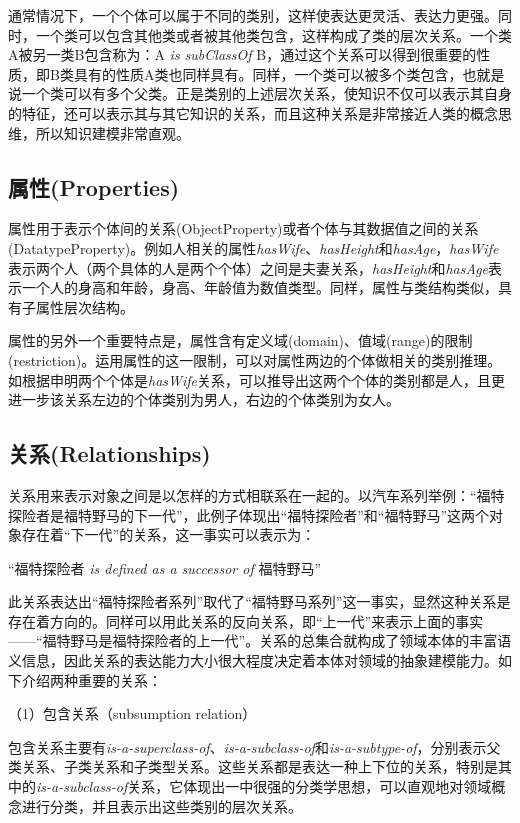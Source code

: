 通常情况下，一个个体可以属于不同的类别，这样使表达更灵活、表达力更强。同时，一个类可以包含其他类或者被其他类包含，这样构成了类的层次关系。一个类A被另一类B包含称为：A \textit{is subClassOf} B，通过这个关系可以得到很重要的性质，即B类具有的性质A类也同样具有。同样，一个类可以被多个类包含，也就是说一个类可以有多个父类。正是类别的上述层次关系，使知识不仅可以表示其自身的特征，还可以表示其与其它知识的关系，而且这种关系是非常接近人类的概念思维，所以知识建模非常直观。

\subsection{属性(Properties)}
属性用于表示个体间的关系(ObjectProperty)或者个体与其数据值之间的关系(DatatypeProperty)。例如人相关的属性\textit{hasWife}、\textit{hasHeight}和\textit{hasAge}，\textit{hasWife}表示两个人（两个具体的人是两个个体）之间是夫妻关系，\textit{hasHeight}和\textit{hasAge}表示一个人的身高和年龄，身高、年龄值为数值类型。同样，属性与类结构类似，具有子属性层次结构。

属性的另外一个重要特点是，属性含有定义域(domain)、值域(range)的限制(restriction)。运用属性的这一限制，可以对属性两边的个体做相关的类别推理。如根据申明两个个体是\textit{hasWife}关系，可以推导出这两个个体的类别都是人，且更进一步该关系左边的个体类别为男人，右边的个体类别为女人。

\subsection{关系(Relationships)}
关系用来表示对象之间是以怎样的方式相联系在一起的。以汽车系列举例：“福特探险者是福特野马的下一代”，此例子体现出“福特探险者”和“福特野马”这两个对象存在着“下一代”的关系，这一事实可以表示为：

\begin{center}
	“福特探险者 \textit{is defined as a successor of} 福特野马”
\end{center}

此关系表达出“福特探险者系列”取代了“福特野马系列”这一事实，显然这种关系是存在着方向的。同样可以用此关系的反向关系，即“上一代”来表示上面的事实——“福特野马是福特探险者的上一代”。关系的总集合就构成了领域本体的丰富语义信息，因此关系的表达能力大小很大程度决定着本体对领域的抽象建模能力。如下介绍两种重要的关系：

（1）包含关系（subsumption relation）

包含关系主要有\textit{is-a-superclass-of}、\textit{is-a-subclass-of}和\textit{is-a-subtype-of}，分别表示父类关系、子类关系和子类型关系。这些关系都是表达一种上下位的关系，特别是其中的\textit{is-a-subclass-of}关系，它体现出一中很强的分类学思想，可以直观地对领域概念进行分类，并且表示出这些类别的层次关系。

